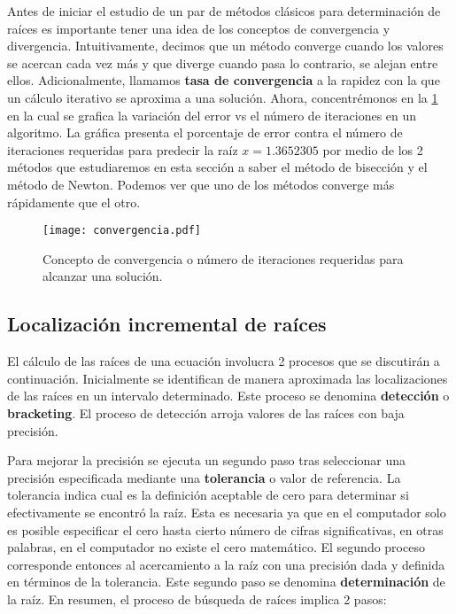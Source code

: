 Antes de iniciar el estudio de un par de métodos clásicos para 
determinación de raíces es importante tener una idea de los conceptos de 
convergencia y divergencia. Intuitivamente, decimos que un método converge 
cuando los valores se acercan cada vez más y que diverge cuando pasa lo 
contrario, se alejan entre ellos. Adicionalmente, llamamos \textbf{tasa de 
convergencia} a la rapidez con la que un cálculo iterativo se aproxima a una 
solución. Ahora, concentrémonos en la \cref{fig:raizconverge} en la cual se 
grafica la variación del error vs el número de iteraciones en un algoritmo. 
La gráfica presenta el porcentaje de error contra el número de iteraciones 
requeridas para predecir la raíz $x=1.3652305$ por medio de los 2 métodos que 
estudiaremos en esta sección a saber el método de bisección y el método de 
Newton. Podemos ver que uno de los métodos converge más rápidamente que el otro.

\begin{figure}[H]
  \centering
  \texttt{[image: convergencia.pdf]}
  \caption{Concepto de convergencia o número de iteraciones requeridas para alcanzar una solución.}
  \label{fig:raizconverge}
\end{figure}
	

\subsection{Localización incremental de raíces}

El cálculo de las raíces de una ecuación involucra 2 procesos que se discutirán 
a continuación. Inicialmente se identifican de manera aproximada las 
localizaciones de las raíces en un intervalo determinado. Este proceso se 
denomina \textbf{detección} o \textbf{bracketing}. El proceso de detección 
arroja valores de las raíces con baja precisión.

Para mejorar la precisión se ejecuta un segundo paso tras seleccionar una 
precisión especificada mediante una \textbf{tolerancia} o valor de referencia. 
La tolerancia indica cual es la definición aceptable de cero para determinar si 
efectivamente se encontró la raíz. Esta es necesaria ya que en el computador 
solo es posible especificar el cero hasta cierto número de cifras 
significativas, en otras palabras, en el computador no existe el cero 
matemático. El segundo proceso corresponde entonces al acercamiento a la raíz 
con una precisión dada y definida en términos de la tolerancia. Este segundo 
paso se denomina \textbf{determinación} de la raíz. En resumen, el 
proceso de búsqueda de raíces implica 2 pasos:

